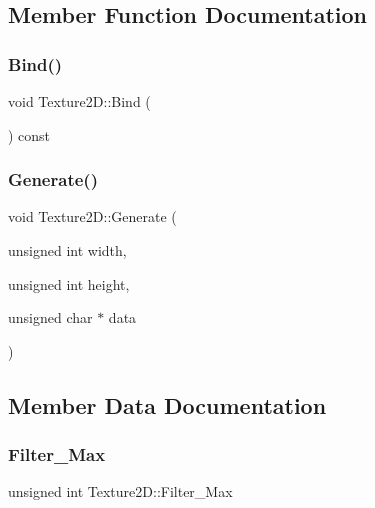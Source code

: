 \subsection{Member Function Documentation}
\mbox{\label{classTexture2D_a97cc1e27512b8f520a59473e6657d7d9}} 
\subsubsection{\texorpdfstring{Bind()}{Bind()}}
{\footnotesize\ttfamily void Texture2\+D\+::\+Bind (\begin{DoxyParamCaption}{ }\end{DoxyParamCaption}) const}

\mbox{\label{classTexture2D_a29768bc9e468322d8b6b86374890c2cc}} 
\subsubsection{\texorpdfstring{Generate()}{Generate()}}
{\footnotesize\ttfamily void Texture2\+D\+::\+Generate (\begin{DoxyParamCaption}\item[{unsigned int}]{width,  }\item[{unsigned int}]{height,  }\item[{unsigned char $\ast$}]{data }\end{DoxyParamCaption})}



\subsection{Member Data Documentation}
\mbox{\label{classTexture2D_ac4c49410570a07a5b7fd0ec4a18ab646}} 
\subsubsection{\texorpdfstring{Filter\+\_\+\+Max}{Filter\_Max}}
{\footnotesize\ttfamily unsigned int Texture2\+D\+::\+Filter\+\_\+\+Max}

\mbox{\label{classTexture2D_a09545dae0e8b68db570506e3aae8e99b}} 
